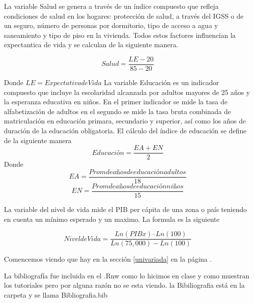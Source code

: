 \documentclass{article}
\begin{document}
La variable Salud se genera a través de un índice compuesto que refleja condiciones de salud en los hogares: protección de salud, a través del IGSS o de un seguro, número de personas por dormitorio, tipo de acceso a agua y saneamiento y tipo de piso en la vivienda. Todos estos factores influencian la expectantica de vida y se calculan de la siguiente manera.

\[ Salud=\frac{LE-20} {85-20} \]

Donde $LE = Expectativa de Vida$
La variable Educación es un indicador compuesto que incluye la escolaridad alcanzada por adultos mayores de 25 años y la esperanza educativa en niños. En el primer indicador se mide la tasa de alfabetización de adultos en el segundo se mide la tasa bruta combinada de matriculación en educación primara, secundario y superior, así como los años de duración de la educación obligatoria. El cálculo del índice de educación se define de la siguiente manera
\[Educación= \frac{EA + EN} {2} \]
Donde
\[EA= \frac{Prom de años de educación adultos} {18}  \]
\[EN= \frac{Prom de años de educación niños} {15}  \]

La variable del nivel de vida mide el PIB per cápita de una zona o país teniendo en cuenta un mínimo esperado y un maximo. La formula es la siguiente

\[Nivel de Vida = \frac {Ln(PIBx) – Ln (100)} {Ln(75,000)-Ln(100)} \]





Comencemos viendo que hay en la sección \ref{univariada} en la página \pageref{univariada}.

\clearpage


\clearpage


\clearpage


\renewcommand{\refname}{Bibliography}


La bibliografía fue incluida en el .Rnw como lo hicimos en clase y como muestran los tutoriales pero por alguna razón no se esta viendo. la Bibiliografia está en la carpeta y se llama Bibliografia.bib
\end{document}
